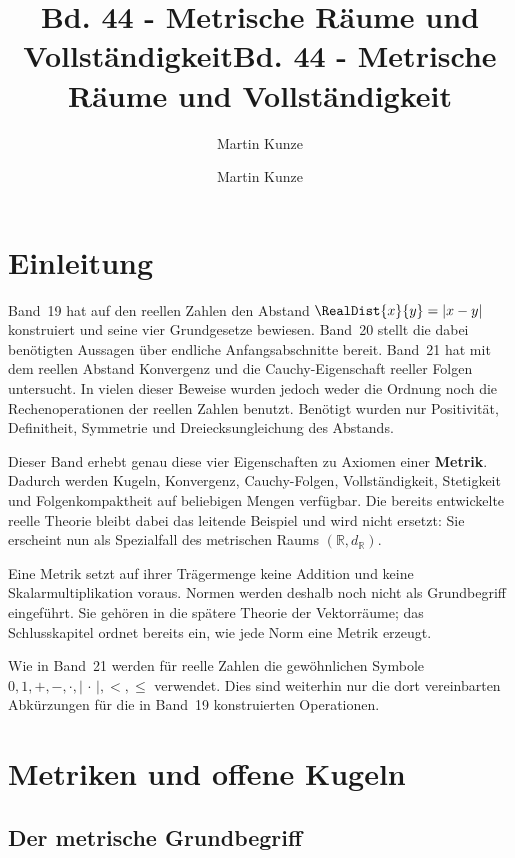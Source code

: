 \documentclass[main.tex]{subfiles}
\title{Bd. 44 - Metrische Räume und Vollständigkeit}
\author{Martin Kunze}
\date{}
\begin{document}
\title{Bd. 44 - Metrische Räume und Vollständigkeit}
\author{Martin Kunze}
\date{}
\hypersetup{pageanchor=false}
\maketitle
\hypersetup{pageanchor=true}
\setcounter{tocdepth}{3}
\tableofcontents
\setcounter{file}{44}
\renewcommand{\FormulaBandID}{44}

\chapter{Einleitung}

Band~19 hat auf den reellen Zahlen den Abstand
\(\RealDist{x}{y}=|x-y|\) konstruiert und seine vier Grundgesetze bewiesen.
Band~20 stellt die dabei benötigten Aussagen über endliche Anfangsabschnitte
bereit. Band~21 hat mit dem reellen Abstand Konvergenz und die
Cauchy-Eigenschaft reeller Folgen untersucht. In vielen dieser Beweise wurden
jedoch weder die Ordnung noch die Rechenoperationen der reellen Zahlen
benutzt. Benötigt wurden nur Positivität, Definitheit, Symmetrie und
Dreiecksungleichung des Abstands.

Dieser Band erhebt genau diese vier Eigenschaften zu Axiomen einer
\textbf{Metrik}. Dadurch werden Kugeln, Konvergenz, Cauchy-Folgen,
Vollständigkeit, Stetigkeit und Folgenkompaktheit auf beliebigen Mengen
verfügbar. Die bereits entwickelte reelle Theorie bleibt dabei das leitende
Beispiel und wird nicht ersetzt: Sie erscheint nun als Spezialfall des
metrischen Raums \((\mathbb R,d_{\mathbb R})\).

Eine Metrik setzt auf ihrer Trägermenge keine Addition und keine
Skalarmultiplikation voraus. Normen werden deshalb noch nicht als
Grundbegriff eingeführt. Sie gehören in die spätere Theorie der Vektorräume;
das Schlusskapitel ordnet bereits ein, wie jede Norm eine Metrik erzeugt.

Wie in Band~21 werden für reelle Zahlen die gewöhnlichen Symbole
\(0,1,+,-,\cdot,|\,\cdot\,|,<,\leq\) verwendet. Dies sind weiterhin nur die
dort vereinbarten Abkürzungen für die in Band~19 konstruierten Operationen.

\chapter{Metriken und offene Kugeln}

\section{Der metrische Grundbegriff}
\end{document}
